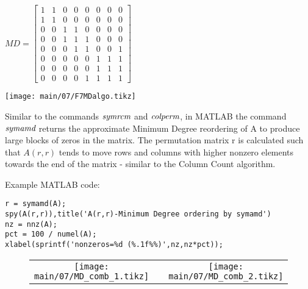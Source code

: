   \begin{minipage}[]{0.50\linewidth}
    \begin{center}
      $MD=
      \begin{bmatrix}
        1 & 1 & 0 & 0 & 0 & 0 & 0 & 0 \\
        1 & 1 & 0 & 0 & 0 & 0 & 0 & 0 \\
        0 & 0 & 1 & 1 & 0 & 0 & 0 & 0 \\
        0 & 0 & 1 & 1 & 1 & 0 & 0 & 0 \\
        0 & 0 & 0 & 1 & 1 & 0 & 0 & 1 \\
        0 & 0 & 0 & 0 & 0 & 1 & 1 & 1 \\
        0 & 0 & 0 & 0 & 0 & 1 & 1 & 1 \\
        0 & 0 & 0 & 0 & 1 & 1 & 1 & 1
      \end{bmatrix}$
    \end{center}
  \end{minipage}
  \begin{minipage}[]{0.49\linewidth}
    \begin{center}
    \texttt{[image: main/07/F7MDalgo.tikz]}
    \end{center}
  \end{minipage}

Similar to the commands $\emph{symrcm}$ and $\emph{colperm}$, in MATLAB the
command $\emph{symamd}$ returns the approximate Minimum Degree reordering of A
to produce large blocks of zeros in the matrix. The permutation matrix r is
calculated such that $A(r,r)$ tends to move rows and columns with higher nonzero
elements towards the end of the matrix - similar to the Column Count algorithm.

Example MATLAB code:
{%
\begin{lstlisting}
r = symamd(A);
spy(A(r,r)),title('A(r,r)-Minimum Degree ordering by symamd')
nz = nnz(A);
pct = 100 / numel(A);
xlabel(sprintf('nonzeros=%d (%.1f%%)',nz,nz*pct));
\end{lstlisting}}
\begin{figure}[H]
  \begin{center}
    \scriptsize
    \begin{tabular}{ccc}
      \texttt{[image: main/07/MD\_comb\_1.tikz]}
      &&
      \texttt{[image: main/07/MD\_comb\_2.tikz]}
    \end{tabular}
  \end{center}
\end{figure}


